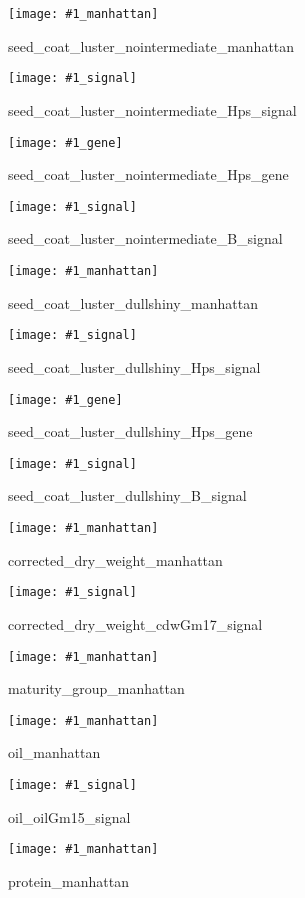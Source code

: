 \documentclass[12pt]{article}
\newenvironment{cfigure}
	{\begin{figure} \centering}
	{\end{figure}}
\newcommand{\manhattanplot}[1]{
\begin{cfigure}
	\texttt{[image: \#1\_manhattan]}
	\caption{#1\_manhattan}
	\label{#1_manhattan}
\end{cfigure}

\clearpage}
\newcommand{\signalplot}[1]{
\begin{cfigure}
	\texttt{[image: \#1\_signal]}
	\caption{#1\_signal}
	\label{#1_signal}
\end{cfigure}

\clearpage}
\newcommand{\geneplot}[1]{
\begin{cfigure}
	\texttt{[image: \#1\_gene]}
	\caption{#1\_gene}
	\label{#1_gene}
\end{cfigure}

\clearpage}
\begin{document}
\manhattanplot{seed_coat_luster_nointermediate}
\signalplot{seed_coat_luster_nointermediate_Hps}
\geneplot{seed_coat_luster_nointermediate_Hps}
\signalplot{seed_coat_luster_nointermediate_B}

\manhattanplot{seed_coat_luster_dullshiny}
\signalplot{seed_coat_luster_dullshiny_Hps}
\geneplot{seed_coat_luster_dullshiny_Hps}
\signalplot{seed_coat_luster_dullshiny_B}

\manhattanplot{corrected_dry_weight}
\signalplot{corrected_dry_weight_cdwGm17}


\manhattanplot{maturity_group}

\manhattanplot{oil}
\signalplot{oil_oilGm15}

\manhattanplot{protein}
\end{document}

